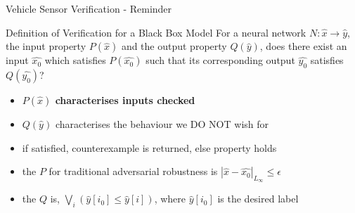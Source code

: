 \documentclass[t,compress,aspectratio=169]{beamer}
\begin{document}

\begin{frame}[fragile]{Vehicle Sensor Verification - Reminder}

\begin{alertblock}{Definition of Verification for a Black Box Model}
		For a neural network $N : \hat{x} \rightarrow \hat{y}$, the input property $P(\hat{x})$ and the output property $Q(\hat{y})$, does there exist an input $\hat{x_0}$ which satisfies $P(\hat{x_0})$ such that its corresponding output $\hat{y_0}$ satisfies $Q(\hat{y_0})$?
	\end{alertblock}
		\vspace{0em}
	\begin{itemize}

		\item\textcolor{aisecpurple}{ \textbf{$P(\hat{x})$ characterises inputs checked}}
		\item $Q(\hat{y})$ characterises the behaviour we \textcolor{aisecred}{DO NOT} wish for
		\item if satisfied, counterexample is returned, else property holds
		\item the $P$ for traditional adversarial robustness is $|\hat{x} - \hat{x_0}|_{L_{\infty}} \leq \epsilon$
		\item the $Q$ is, $\bigvee_i(\hat{y}[i_0] \leq \hat{y}[i])$, where $\hat{y}[i_0]$ is the desired label
	\end{itemize}
%
%
	\end{frame}
\end{document}
